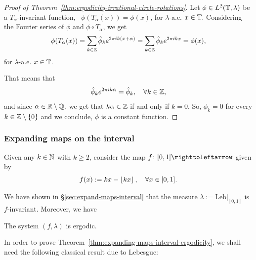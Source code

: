 \begin{proof}[Proof of Theorem~\ref{thm:ergodicity-irrational-circle-rotations}]
  Let $\phi\in L^2(\mathbb{T},\lambda)$ be a $T_\alpha$-invariant function, \ie~$\phi(T_\alpha(x))=\phi(x)$, for $\lambda$-a.e. $x\in\mathbb{T}$. Considering the Fourier series of $\phi$ and $\phi\circ T_\alpha$, we get
  \begin{displaymath}
    \phi(T_\alpha(x))=\sum_{k\in\mathbb{Z}}\hat\phi_k e^{2\pi ik(x+\alpha)} = \sum_{k\in\mathbb{Z}} \hat\phi_ke^{2\pi ikx} = \phi(x),
  \end{displaymath}
  for $\lambda$-a.e. $x\in\mathbb{T}$.

  That means that
  \begin{displaymath}
    \hat\phi_ke^{2\pi ik\alpha}=\hat\phi_k, \quad\forall k\in\mathbb{Z},
  \end{displaymath}
  and since $\alpha\in\mathbb{R}\setminus\mathbb{Q}$, we get that $k\alpha\in\mathbb{Z}$ if and only if $k=0$. So, $\hat\phi_k=0$ for every $k\in\mathbb{Z}\setminus\{0\}$ and we conclude, $\phi$ is a constant function.
\end{proof}

\subsubsection{Expanding maps on the interval}\label{sec:expanding-maps-interval-ergodicity}

Given any $k\in\mathbb{N}$ with $k\geq 2$, consider the map $f\colon [0,1]\carr$ given by
\begin{displaymath}
  f(x):=kx-\left\lfloor{kx}\right\rfloor,  \quad\forall x\in [0,1].
\end{displaymath}

We have shown in \S\ref{sec:expand-maps-interval} that the measure $\lambda:=\mathrm{Leb}\big|_{[0,1]}$ is $f$-invariant. Moreover, we have
\begin{theorem}\label{thm:expanding-maps-interval-ergodicity}
  The system $(f,\lambda)$ is ergodic.
\end{theorem}

In order to prove Theorem~\ref{thm:expanding-maps-interval-ergodicity}, we shall need the following classical result due to Lebesgue:

